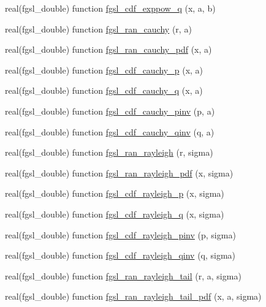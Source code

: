 \begin{DoxyCompactItemize}
\item 
real(fgsl\+\_\+double) function \hyperlink{rng_8finc_ae336d786addd5c9838e379079f2118e8}{fgsl\+\_\+cdf\+\_\+exppow\+\_\+q} (x, a, b)
\item 
real(fgsl\+\_\+double) function \hyperlink{rng_8finc_a5a546c09d9cae9ebedb9b07ea32efeda}{fgsl\+\_\+ran\+\_\+cauchy} (r, a)
\item 
real(fgsl\+\_\+double) function \hyperlink{rng_8finc_ace5b97b9a5d4c816d87a4266696fcdb5}{fgsl\+\_\+ran\+\_\+cauchy\+\_\+pdf} (x, a)
\item 
real(fgsl\+\_\+double) function \hyperlink{rng_8finc_a0e344d18cde233ed8002f084dde9eb60}{fgsl\+\_\+cdf\+\_\+cauchy\+\_\+p} (x, a)
\item 
real(fgsl\+\_\+double) function \hyperlink{rng_8finc_abcdb7697f3622398517eecdcbe437b28}{fgsl\+\_\+cdf\+\_\+cauchy\+\_\+q} (x, a)
\item 
real(fgsl\+\_\+double) function \hyperlink{rng_8finc_a074ae18be87299f8a671bc14c18fb12d}{fgsl\+\_\+cdf\+\_\+cauchy\+\_\+pinv} (p, a)
\item 
real(fgsl\+\_\+double) function \hyperlink{rng_8finc_a74774e42acfb80fb2fe4417ce410e760}{fgsl\+\_\+cdf\+\_\+cauchy\+\_\+qinv} (q, a)
\item 
real(fgsl\+\_\+double) function \hyperlink{rng_8finc_ab3b2b9a1275e0581f2f62f4bb974bba0}{fgsl\+\_\+ran\+\_\+rayleigh} (r, sigma)
\item 
real(fgsl\+\_\+double) function \hyperlink{rng_8finc_aeb1b678250b5a3437e2a5da86dc7027e}{fgsl\+\_\+ran\+\_\+rayleigh\+\_\+pdf} (x, sigma)
\item 
real(fgsl\+\_\+double) function \hyperlink{rng_8finc_a376b011d221203a9830ad4681bda4c53}{fgsl\+\_\+cdf\+\_\+rayleigh\+\_\+p} (x, sigma)
\item 
real(fgsl\+\_\+double) function \hyperlink{rng_8finc_ae07c15e9d38069dc78dd1fc10a3b37ab}{fgsl\+\_\+cdf\+\_\+rayleigh\+\_\+q} (x, sigma)
\item 
real(fgsl\+\_\+double) function \hyperlink{rng_8finc_ac0bf5e17a1114cf02a6d561aafdbebc0}{fgsl\+\_\+cdf\+\_\+rayleigh\+\_\+pinv} (p, sigma)
\item 
real(fgsl\+\_\+double) function \hyperlink{rng_8finc_a669f0c3f452b3f4779ee3d66eb292e6f}{fgsl\+\_\+cdf\+\_\+rayleigh\+\_\+qinv} (q, sigma)
\item 
real(fgsl\+\_\+double) function \hyperlink{rng_8finc_a251553996a7fe7909c52a740eaeb5a5c}{fgsl\+\_\+ran\+\_\+rayleigh\+\_\+tail} (r, a, sigma)
\item 
real(fgsl\+\_\+double) function \hyperlink{rng_8finc_a1d05f85a0832a708308a2022a295f8e2}{fgsl\+\_\+ran\+\_\+rayleigh\+\_\+tail\+\_\+pdf} (x, a, sigma)

\end{DoxyCompactItemize}
